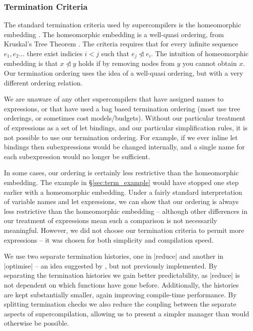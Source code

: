 \documentclass[draft]{sigplanconf}
\begin{document}
\subsubsection{Termination Criteria}

The standard termination criteria used by supercompilers is the homeomorphic embedding \cite{leuschel:homeomorphic}. The homeomorphic embedding is a well-quasi ordering, from Kruskal's Tree Theorem \cite{kruskal:tree}. The criteria requires that for every infinite sequence $e_1,e_2 \ldots$ there exist indicies $i < j$ such that $e_j \ntriangleleft e_i$. The intuition of homeomorphic embedding is that $x \ntriangleleft y$ holds if by removing nodes from $y$ you cannot obtain $x$. Our termination ordering uses the idea of a well-quasi ordering, but with a very different ordering relation.

We are unaware of any other supercompilers that have assigned names to expressions, or that have used a bag based termination ordering (most use tree orderings, or sometimes cost models/budgets). Without our particular treatment of expressions as a set of let bindings, and our particular simplification rules, it is not possible to use our termination ordering. For example, if we ever inline let bindings then subexpressions would be changed internally, and a single name for each subexpression would no longer be sufficient.

In some cases, our ordering is certainly less restrictive than the homeomorphic embedding. The example in \S\ref{sec:term_example} would have stopped one step earlier with a homeomorphic embedding. Under a fairly standard interpretation of variable names and let expressions, we can show that our ordering is always less restrictive than the homeomorphic embedding -- although other differences in our treatment of expressions mean such a comparison is not necessarily meaningful. However, we did not choose our termination criteria to permit more expressions -- it was chosen for both simplicity and compilation speed.

We use two separate termination histories, one in |reduce| and another in |optimise| -- an idea suggested by \citet{me:thesis}, but not previously implemented. By separating the termination histories we gain better predictability, as |reduce| is not dependent on which functions have gone before. Additionally, the histories are kept substantially smaller, again improving compile-time performance. By splitting termination checks we also reduce the coupling between the separate aspects of supercompilation, allowing us to present a simpler manager than would otherwise be possible.
\end{document}
